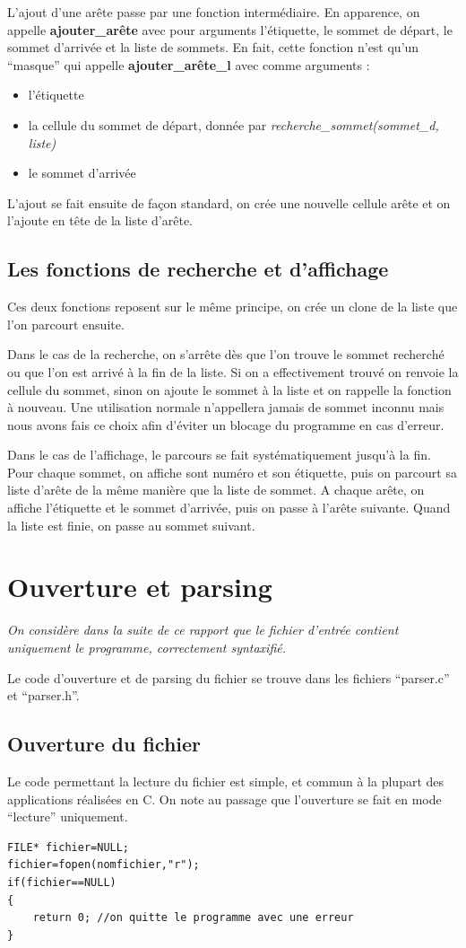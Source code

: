 \documentclass[a4paper,11pt]{article}
\begin{document}
		L'ajout d'une arête passe par une fonction intermédiaire. En apparence, on appelle \textbf{ajouter\_arête} avec pour arguments l'étiquette, le sommet de départ, le sommet d'arrivée et la liste de sommets. En fait, cette fonction n'est qu'un ``masque'' qui appelle \textbf{ajouter\_arête\_l} avec comme arguments : 
		\begin{itemize}
			\item l'étiquette
			\item la cellule du sommet de départ, donnée par \textit{recherche\_sommet(sommet\_d, liste)}
			\item le sommet d'arrivée
		\end{itemize}
		L'ajout se fait ensuite de façon standard, on crée une nouvelle cellule arête et on l'ajoute en tête de la liste d'arête.
	\subsection{Les fonctions de recherche et d'affichage}
		\label{parcourir}Ces deux fonctions reposent sur le même principe, on crée un clone de la liste que l'on parcourt ensuite.

 Dans le cas de la recherche, on s'arrête dès que l'on trouve le sommet recherché ou que l'on est arrivé à la fin de la liste. Si on a effectivement trouvé on renvoie la cellule du sommet, sinon on ajoute le sommet à la liste et on rappelle la fonction à nouveau. Une utilisation normale n'appellera jamais de sommet inconnu mais nous avons fais ce choix afin d'éviter un blocage du programme en cas d'erreur.

	Dans le cas de l'affichage, le parcours se fait systématiquement jusqu'à la fin. Pour chaque sommet, on affiche sont numéro et son étiquette, puis on parcourt sa liste d'arête de la même manière que la liste de sommet. A chaque arête, on affiche l'étiquette et le sommet d'arrivée, puis on passe à l'arête suivante. Quand la liste est finie, on passe au sommet suivant.

	\section{Ouverture et parsing}
		\textit{On considère dans la suite de ce rapport que le fichier d'entrée contient uniquement le programme, correctement syntaxifié.}
		
		Le code d'ouverture et de parsing du fichier se trouve dans les fichiers ``parser.c'' et ``parser.h''.
		\subsection{Ouverture du fichier}
		Le code permettant la lecture du fichier est simple, et commun à la plupart des applications réalisées en C. On note au passage que l'ouverture se fait en mode ``lecture'' uniquement.
		\begin{lstlisting}
FILE* fichier=NULL;
fichier=fopen(nomfichier,"r");
if(fichier==NULL)
{
	return 0; //on quitte le programme avec une erreur
}
		\end{lstlisting}
\end{document}

